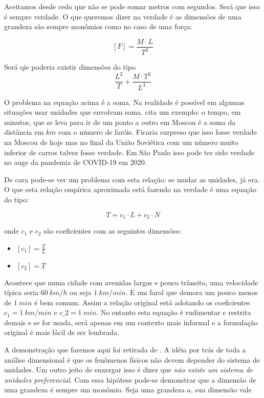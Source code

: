 Aceitamos desde cedo que não se pode somar metros com segundos. Será que isso é sempre verdade. O que queremos dizer na verdade é as dimensões de uma grandeza são sempre monômios como no caso de uma força:

\[
  [F] = \frac{M\cdot L}{T^2}
\]

Será qie poderia existir dimensões do tipo
\[
\frac{L^2}{T} + \frac{M\cdot T^2}{L^3}
\]

O problema na equação acima é a soma. Na realidade é possível em algumas situações usar unidades que envolvam soma. \cite{Barenblatt96} cita um exemplo: o tempo, em minutos, que se leva para ir de um ponto a outro em Moscou é a soma da distância em $km$ com o número de faróis. Ficaria surpreso que isso fosse verdade na Moscou de hoje mas no final da União Soviética com um número muito inferior de carros talvez fosse verdade. Em São Paulo isso pode ter sido verdade no auge da pandemia de COVID-19 em 2020.

De cara pode-se ver um problema com esta relação: se mudar as unidades, já era. O que esta relação empírica aproximada está fazendo na verdade é uma equação do tipo:

\[
T = c_1 \cdot L + c_2 \cdot N
\]

onde $c_1$ e $c_2$ são coeficientes com as seguintes dimensões:

\begin{itemize}
\item $[c_1] = \frac{T}{L}$
\item $[c_2] = T$
\end{itemize}

Acontece que numa cidade com avenidas largas e pouco trânsito, uma velocidade típica seria $60\:km/h$ ou seja $1\:km/min$. E um farol que demora um pouco menos de $1\:min$ é bem comum. Assim a relação original está adotando os coeficientes $c_1 = 1 \:km/min$ e $c\_2 = 1\: min$. No entanto esta equação é rudimentar e restrita demais e se for usada, será apenas em um contexto mais informal e a formulação original é mais fácil de ser lembrada.

A demonstração que faremos aqui foi retirada de \cite{Barenblatt96}. A idéia por trás de toda a análise dimensional é que os fenômenos físicos não devem depender do sistema de unidades. Um outro jeito de enxergar isso é dizer que \emph{não existe um sistema de unidades preferencial}. Com essa hipótese pode-se demonstrar que a dimensão de uma grandeza é sempre um monômio. Seja uma grandeza $a$, sua dimensão vale

